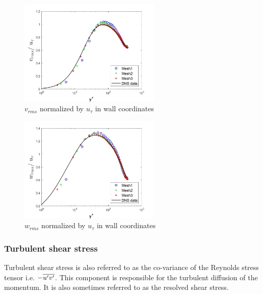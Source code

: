 \begin{figure}[h!]
    \centering
    \includegraphics[width=0.6\textwidth]{06_Resultsanddiscussion/figur/UDNS_2016/vrms_wall_coords.jpg}
    \caption{$v_{rms}$ normalized by $u_\tau$ in wall coordinates}
    \label{vrms wall}
\end{figure}

\begin{figure}[h!]
    \centering
    \includegraphics[width=0.6\textwidth]{06_Resultsanddiscussion/figur/UDNS_2016/wrms_wall_coords.jpg}
    \caption{$w_{rms}$ normalized by $u_\tau$ in wall coordinates}
    \label{wrms wall}
\end{figure}

\subsubsection{Turbulent shear stress}
Turbulent shear stress is also referred to as the co-variance of the Reynolds stress tensor i.e. $-\overline{{u}^\prime{v}^\prime}$. This component is responsible for the turbulent diffusion of the momentum. It is also sometimes referred to as the resolved shear stress. 

